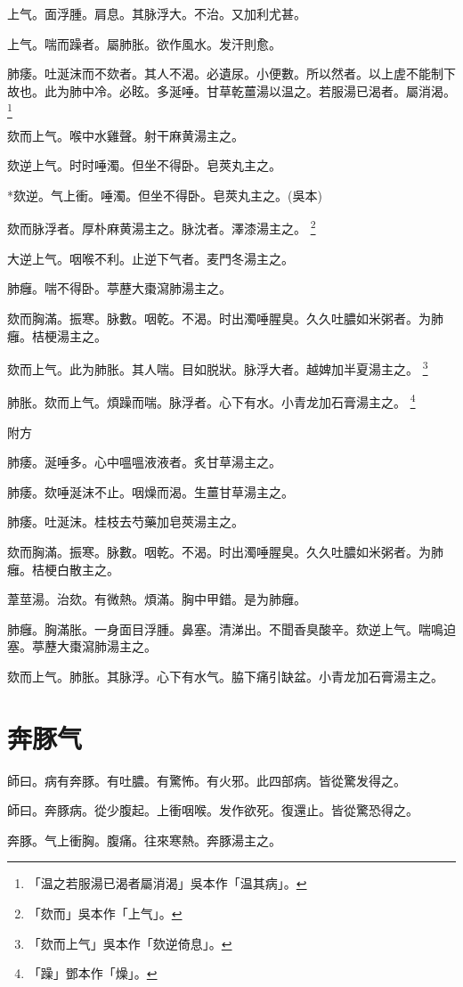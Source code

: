 \documentclass[b5paper,twoside,zihao=-4,UTF8]{ctexbook}
\begin{document}
上气。面浮腫。肩息。其脉浮大。不治。又加利尤甚。

上气。喘而躁者。屬肺胀。欲作風水。发汗則愈。

肺痿。吐涎沫而不欬者。其人不渴。必遺尿。小便數。所以然者。以上虗不能制下故也。此为肺中冷。必眩。多涎唾。甘草乾薑湯以温之。若服湯已渴者。屬消渴。
	\footnote{「温之若服湯已渴者屬消渴」吳本作「温其病」。}

欬而上气。喉中水雞聲。射干麻黄湯主之。

欬逆上气。时时唾濁。但坐不得卧。皂莢丸主之。

*欬逆。气上衝。唾濁。但坐不得卧。皂莢丸主之。(吳本)

欬而脉浮者。厚朴麻黄湯主之。脉沈者。澤漆湯主之。
	\footnote{「欬而」吳本作「上气」。}

大逆上气。咽喉不利。止逆下气者。麦門冬湯主之。

肺癰。喘不得卧。葶藶大棗瀉肺湯主之。

欬而胸滿。振寒。脉數。咽乾。不渴。时出濁唾腥臭。久久吐膿如米粥者。为肺癰。桔梗湯主之。

欬而上气。此为肺胀。其人喘。目如脱狀。脉浮大者。越婢加半夏湯主之。
	\footnote{「欬而上气」吳本作「欬逆倚息」。}

肺胀。欬而上气。煩躁而喘。脉浮者。心下有水。小青龙加石膏湯主之。
	\footnote{「躁」鄧本作「燥」。}

附方

肺痿。涎唾多。心中嗢嗢液液者。炙甘草湯主之。

肺痿。欬唾涎沫不止。咽燥而渴。生薑甘草湯主之。

肺痿。吐涎沫。桂枝去芍藥加皂莢湯主之。

欬而胸滿。振寒。脉數。咽乾。不渴。时出濁唾腥臭。久久吐膿如米粥者。为肺癰。桔梗白散主之。

葦莖湯。治欬。有微熱。煩滿。胸中甲錯。是为肺癰。

肺癰。胸滿胀。一身面目浮腫。鼻塞。清涕出。不聞香臭酸辛。欬逆上气。喘鳴迫塞。葶藶大棗瀉肺湯主之。

欬而上气。肺胀。其脉浮。心下有水气。脇下痛引缺盆。小青龙加石膏湯主之。

\chapter{奔豚气}

師曰。病有奔豚。有吐膿。有驚怖。有火邪。此四部病。皆從驚发得之。

師曰。奔豚病。從少腹起。上衝咽喉。发作欲死。復還止。皆從驚恐得之。

奔豚。气上衝胸。腹痛。往來寒熱。奔豚湯主之。
\end{document}
